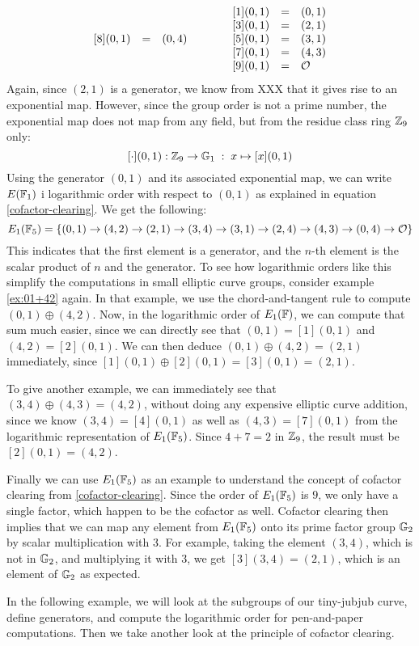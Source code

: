 \begin{example}
$$\begin{array}{lccr}
\begin{array}{lcl}
{}[8](0,1) &=& (0, 4) \\ 
\end{array} & & &
{}\begin{array}{lcl}
{}[1](0,1) &=& (0, 1) \\
{}[3](0,1) &=& (2, 1) \\
{}[5](0,1) &=& (3, 1) \\
{}[7](0,1) &=& (4, 3) \\
{}[9](0,1) &=& \mathcal{O}
\end{array}
\end{array}
$$
Again, since $(2,1)$ is a generator, we know from XXX that it gives rise to an exponential map. However, since the group order is not a prime number, the exponential map does not map from any field, but from the residue class ring $\mathbb{Z}_9$ only:
$$
[\cdot](0,1): \mathbb{Z}_9 \to \mathbb{G}_1\; : \; x\mapsto [x](0,1) 
$$
Using the generator $(0,1)$ and its associated exponential map, we can write $E(\mathbb{F}_1)$ i logarithmic order with respect to $(0,1)$ as explained in equation \ref{cofactor-clearing}. We get the following:
$$
E_1(\mathbb{F}_5) = \{(0, 1)\to (4, 2)\to (2, 1)\to (3, 4)\to (3, 1)\to (2, 4)\to (4, 3)\to (0, 4)\to \mathcal{O} \}
$$
This indicates that the first element is a generator, and the $n$-th element is the scalar product of $n$ and the generator. To see how logarithmic orders like this simplify the computations in small elliptic curve groups, consider example \ref{ex:01+42} again. In that example, we use the chord-and-tangent rule to compute $(0,1)\oplus (4,2)$. Now, in the logarithmic order of $E_1(\mathbb{F})$, we can compute that sum much easier, since we can directly see that $(0,1)=[1](0,1)$ and $(4,2)=[2](0,1)$. We can then deduce $(0,1)\oplus (4,2)= (2,1)$ immediately, since $[1](0,1)\oplus [2](0,1)= [3](0,1)=(2,1)$.

To give another example, we can immediately see that $(3,4)\oplus (4,3) = (4,2)$, without doing any expensive elliptic curve addition, since we know $(3,4)= [4](0,1)$ as well as $(4,3)= [7](0,1)$ from the logarithmic representation of $E_1(\mathbb{F}_5)$. Since $4+7 = 2$ in $\mathbb{Z}_9$, the result must be $[2](0,1)=(4,2)$.

Finally we can use $E_1(\mathbb{F}_5)$ as an example to understand the concept of cofactor clearing from \ref{cofactor-clearing}. Since the order of $E_1(\mathbb{F}_5)$ is $9$, we only have a single factor, which happen to be the cofactor as well. Cofactor clearing then implies that we can map any element from $E_1(\mathbb{F}_5)$ onto its prime factor group $\mathbb{G}_2$ by scalar multiplication with $3$. For example, taking the element $(3,4)$, which is not in $\mathbb{G}_2$, and multiplying it with $3$, we get $[3](3,4)= (2,1)$, which is an element of $\mathbb{G}_2$ as expected.
\end{example}
In the following example, we will look at the subgroups of our tiny-jubjub curve, define generators, and compute the logarithmic order for pen-and-paper computations. Then we take another look at the principle of cofactor clearing.

